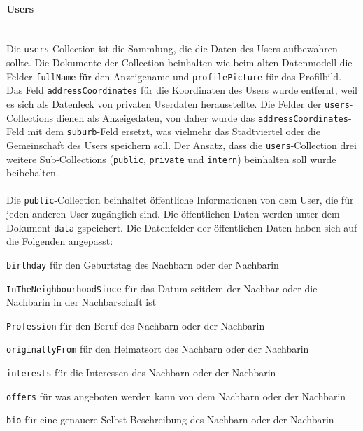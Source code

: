 
\paragraph{Users}\mbox{} \\
Die \texttt{users}-Collection ist die Sammlung, die die Daten des Users aufbewahren sollte. Die Dokumente der Collection beinhalten wie beim alten Datenmodell die Felder \texttt{fullName} für den Anzeigename und \texttt{profilePicture} für das Profilbild. Das Feld \texttt{addressCoordinates} für die Koordinaten des Users wurde entfernt, weil es sich als Datenleck von privaten Userdaten herausstellte. Die Felder der \texttt{users}-Collections dienen als Anzeigedaten, von daher wurde das \texttt{addressCoordinates}-Feld mit dem \texttt{suburb}-Feld ersetzt, was vielmehr das Stadtviertel oder die Gemeinschaft des Users speichern soll.
Der Ansatz, dass die \texttt{users}-Collection drei weitere Sub-Collections (\texttt{public}, \texttt{private} und \texttt{intern}) beinhalten soll wurde beibehalten.
\\\\
Die \texttt{public}-Collection beinhaltet öffentliche Informationen von dem User, die für jeden anderen User zugänglich sind. Die öffentlichen Daten werden unter dem Dokument \texttt{data} gspeichert. Die Datenfelder der öffentlichen Daten haben sich auf die Folgenden angepasst:
\begin{compactitem}
  \item \texttt{birthday} für den Geburtstag des Nachbarn oder der Nachbarin
  \item \texttt{InTheNeighbourhoodSince} für das Datum seitdem der Nachbar oder die Nachbarin in der Nachbarschaft ist
  \item \texttt{Profession} für den Beruf des Nachbarn oder der Nachbarin
  \item \texttt{originallyFrom} für den Heimatsort des Nachbarn oder der Nachbarin
  \item \texttt{interests} für die Interessen des Nachbarn oder der Nachbarin
  \item \texttt{offers} für was angeboten werden kann von dem Nachbarn oder der Nachbarin
  \item \texttt{bio} für eine genauere Selbst-Beschreibung des Nachbarn oder der Nachbarin
\end{compactitem}
